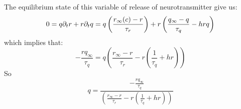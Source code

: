 The equilibrium state of this variable of release of neurotransmitter give us:  
\begin{equation}
    0 = q \partial_t r + r \partial_t q \\ = q \left(\frac{r_{\infty}(c) - r}{\tau_r}\right) + r \left(\frac{q_{\infty}-q}{\tau_q} - h r q\right)
\end{equation}
which implies that: 
\begin{equation}
     -\frac{r q_{\infty}}{\tau_q}  = q \left(\frac{r_{\infty} - r}{\tau_r} - r( \frac{1}{\tau_q} + h r ) \right)
\end{equation}
So 
\begin{equation}
     q = \frac{-\frac{r q_{\infty}}{\tau_q}}{\left(\frac{r_{\infty} - r}{\tau_r} - r( \frac{1}{\tau_q} + h r ) \right)}  
\end{equation}
